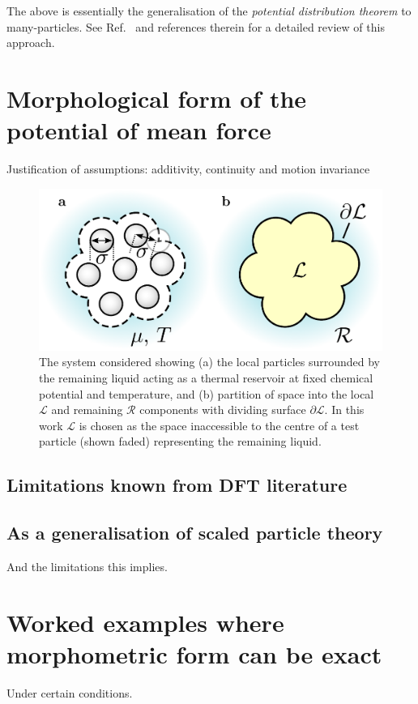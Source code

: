 \documentclass[12pt]{report}
\begin{document}
The above is essentially the generalisation of the \emph{potential distribution theorem} \cite{Widom1963,Widom1982} to many-particles. See Ref.\ \cite{Rowlinson2002} and references therein for a detailed review of this approach.

\section{Morphological form of the potential of mean force}
Justification of assumptions: additivity, continuity and motion invariance

\begin{figure}
  \includegraphics[width=\linewidth]{droplet-morph}
  \caption{
    The system considered showing
    (a) the local particles surrounded by the remaining liquid acting as a thermal reservoir at fixed chemical potential and temperature, and
    (b) partition of space into the local $\mathcal{L}$ and remaining $\mathcal{R}$ components with dividing surface $\partial\mathcal{L}$.
    In this work $\mathcal{L}$ is chosen as the space inaccessible to the centre of a test particle (shown faded) representing the remaining liquid.
  }
\end{figure}

\subsection{Limitations known from DFT literature}
\subsection{As a generalisation of scaled particle theory}
And the limitations this implies.

\section{Worked examples where morphometric form can be exact}
Under certain conditions.
\end{document}
